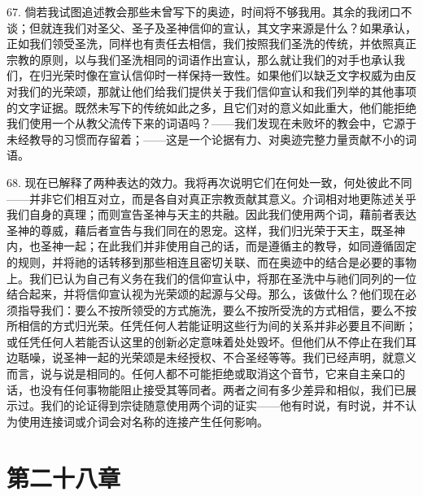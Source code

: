 67. 倘若我试图追述教会那些未曾写下的奥迹，时间将不够我用。其余的我闭口不谈；但就连我们对圣父、圣子及圣神信仰的宣认，其文字来源是什么？如果承认，正如我们领受圣洗，同样也有责任去相信，我们按照我们圣洗的传统，并依照真正宗教的原则，以与我们圣洗相同的词语作出宣认，那么就让我们的对手也承认我们，在归光荣时像在宣认信仰时一样保持一致性。如果他们以缺乏文字权威为由反对我们的光荣颂，那就让他们给我们提供关于我们信仰宣认和我们列举的其他事项的文字证据。既然未写下的传统如此之多，且它们对的意义如此重大，他们能拒绝我们使用一个从教父流传下来的词语吗？——我们发现在未败坏的教会中，它源于未经教导的习惯而存留着；——这是一个论据有力、对奥迹完整力量贡献不小的词语。\par

68. 现在已解释了两种表达的效力。我将再次说明它们在何处一致，何处彼此不同——并非它们相互对立，而是各自对真正宗教贡献其意义。介词相对地更陈述关乎我们自身的真理；而则宣告圣神与天主的共融。因此我们使用两个词，藉前者表达圣神的尊威，藉后者宣告与我们同在的恩宠。这样，我们归光荣于天主，既圣神内，也圣神一起；在此我们并非使用自己的话，而是遵循主的教导，如同遵循固定的规则，并将祂的话转移到那些相连且密切关联、而在奥迹中的结合是必要的事物上。我们已认为自己有义务在我们的信仰宣认中，将那在圣洗中与祂们同列的一位结合起来，并将信仰宣认视为光荣颂的起源与父母。那么，该做什么？他们现在必须指导我们：要么不按所领受的方式施洗，要么不按所受洗的方式相信，要么不按所相信的方式归光荣。任凭任何人若能证明这些行为间的关系并非必要且不间断；或任凭任何人若能否认这里的创新必定意味着处处毁坏。但他们从不停止在我们耳边聒噪，说圣神一起的光荣颂是未经授权、不合圣经等等。我们已经声明，就意义而言，说与说是相同的。任何人都不可能拒绝或取消这个音节，它来自主亲口的话，也没有任何事物能阻止接受其等同者。两者之间有多少差异和相似，我们已展示过。我们的论证得到宗徒随意使用两个词的证实——他有时说，有时说，并不认为使用连接词或介词会对名称的连接产生任何影响。\par


\section{第二十八章}

